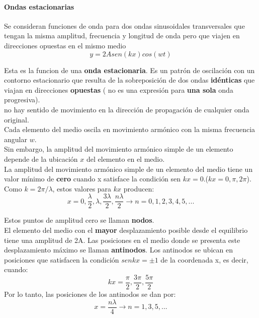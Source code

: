 \documentclass[10pt]{article}
\begin{document}
\paragraph{Ondas estacionarias}
Se consideran funciones de onda para dos ondas sinusoidales transversales que tengan la misma amplitud, frecuencia y longitud de onda pero que viajen en direcciones opuestas en el mismo medio
\begin{equation*}
	y = 2Asen(kx)cos(wt)
\end{equation*}

Esta es la funcion de una \textbf{onda estacionaria}. Es un patrón de oscilación con un contorno 
estacionario que resulta de la sobreposición de dos ondas \textbf{idénticas}
que viajan en direcciones \textbf{opuestas} ( no es
una expresión para \textbf{una sola} onda progresiva).\\
no hay sentido de movimiento en la dirección de propagación de cualquier onda
original.\\
Cada elemento del medio oscila en movimiento armónico con la misma frecuencia angular $w$.\\
Sin embargo, la amplitud del movimiento armónico simple de un elemento depende de la ubicación
$x$ del elemento en el medio.\\
La amplitud del movimiento armónico simple de un elemento del medio tiene un valor
mínimo de \textbf{cero} cuando x satisface la condición sen $kx= 0$.($kx = 0, \pi, 2\pi$).\\
Como $k = 2\pi/\lambda$, estos valores para $kx$ producen:
\begin{equation*}
	x = 0, \frac{\lambda}{2}, \lambda, \frac{3\lambda}{2}, \frac{n\lambda}{2} \rightarrow n=0,1,2,3,4,5,...
\end{equation*}

Estos puntos de amplitud cero se llaman \textbf{nodos}.\\
\linebreak
El elemento del medio con el \textbf{mayor} desplazamiento posible desde el equilibrio tiene
una amplitud de 2A. Las posiciones en el medio donde se presenta este desplazamiento máximo se llaman \textbf{antinodos}. Los
antinodos se ubican en posiciones que satisfacen la condición $sen kx= \pm1$ de la coordenada x, es decir, cuando:
\begin{equation*}
	kx =  \dfrac{\pi}{2},  \dfrac{3\pi}{2},  \dfrac{5\pi}{2}
\end{equation*}
Por lo tanto, las posiciones de los antinodos se dan por:
\begin{equation*}
	x = \dfrac{n\lambda}{4} \rightarrow n = 1,3,5,...
\end{equation*}
\end{document}
